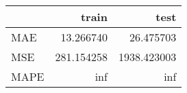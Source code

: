 \begin{tabular}{lrr}
\toprule
{} &       train &         test \\
\midrule
MAE  &   13.266740 &    26.475703 \\
MSE  &  281.154258 &  1938.423003 \\
MAPE &         inf &          inf \\
\bottomrule
\end{tabular}

